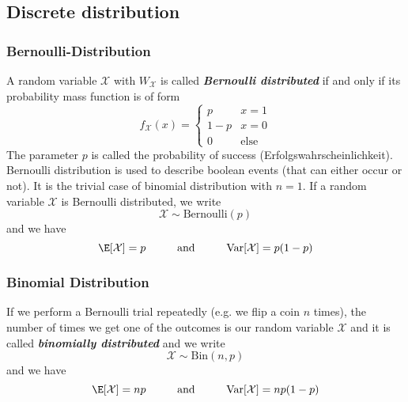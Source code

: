 \newpage
\subsection{Discrete distribution}
\subsubsection{Bernoulli-Distribution}
A random variable $\mathcal{X}$ with $W_{\mathcal{X}}$ is called \textit{\textbf{Bernoulli distributed}} if and only if its probability mass function is of form
\[
    f_{\mathcal{X}}(x) = \begin{cases}
        p     & x = 1       \\
        1 - p & x = 0       \\
        0     & \text{else}
    \end{cases}
\]
The parameter $p$ is called the probability of success (Erfolgswahrscheinlichkeit). Bernoulli distribution is used to describe boolean events (that can either occur or not). It is the trivial case of binomial distribution with $n = 1$. If a random variable $\mathcal{X}$ is Bernoulli distributed, we write
\[
    \mathcal{X} \sim \text{Bernoulli}(p)
\]
and we have
\[
    \E[\mathcal{X}] = p \hspace{1cm} \text{and} \hspace{1cm} \text{Var}[\mathcal{X}] = p(1 - p)
\]

\subsubsection{Binomial Distribution}
If we perform a Bernoulli trial repeatedly (e.g. we flip a coin $n$ times), the number of times we get one of the outcomes is our random variable $\mathcal{X}$ and it is called \textbf{\textit{binomially distributed}} and we write
\[
    \mathcal{X} \sim \text{Bin}(n, p)
\]
and we have
\[
    \E[\mathcal{X}] = np \hspace{1cm} \text{and} \hspace{1cm} \text{Var}[\mathcal{X}] = np(1 - p)
\]



